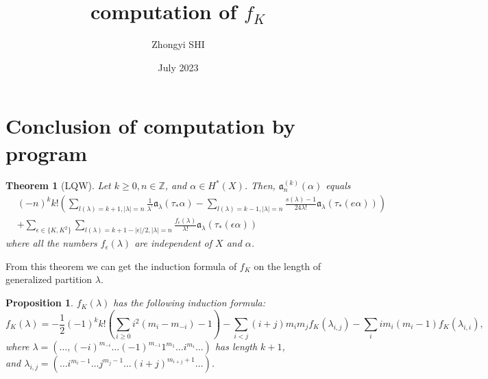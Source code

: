 \documentclass{article}
\title{computation of $f_K$}
\author{Zhongyi SHI }
\date{July 2023}
\newtheorem{theorem}{Theorem}[section]
\newtheorem{prop}{Proposition}[theorem]
\newtheorem{lemma}{Lemma}[theorem]
\begin{document}
\maketitle
\tableofcontents
\section{Conclusion of computation by program}

\begin{theorem}[LQW]
Let $k\geqslant0,n\in\mathbb{Z}$, and $\alpha\in H^{*}(X)$. Then, $\mathfrak{a}^{(k)}_n (\alpha)$ equals 
\[
\begin{aligned}
&(-n)^k k! \left(\sum_{\mathit{l}(\lambda)=k+1,|\lambda|=n} \frac{1}{\lambda^!} \mathfrak{a}_\lambda(\tau_*\alpha)-\sum_{\mathit{l}(\lambda)=k-1,|\lambda|=n} \frac{s(\lambda)-1}{24\lambda!} \mathfrak{a}_\lambda(\tau_*(e\alpha))\right) \\
&+\sum_{\epsilon\in\{K,K^2\}} \sum_{\mathit{l}(\lambda)=k+1-|\epsilon|/2,|\lambda|=n} \frac{f_\epsilon(\lambda)} {\lambda!} \mathfrak{a}_\lambda(\tau_*(\epsilon\alpha))
\end{aligned}
\]
where all the numbers $f_\epsilon(\lambda)$ are independent of $X$ and $\alpha$.
\end{theorem}

From this theorem we can get the induction formula of $f_K$ on the length of generalized partition $\lambda$.

\begin{prop}
$f_K(\lambda)$ has the following induction formula:
\[f_K(\lambda) = -\frac{1}{2}(-1)^kk!\left(\sum_{i\geqslant 0}i^2(m_i-m_{-i})-1\right)-\sum_{i<j}(i+j)m_im_jf_K(\lambda_{i,j})-\sum_{i}im_i(m_i-1)f_K(\lambda_{i,i}),\]
where $\lambda=(\ldots,(-i)^{m_{-i}}\ldots(-1)^{m_{-1}}1^{m_1}\ldots i^{m_i}\ldots)$ has length $k+1$, \\
and $\lambda_{i,j}=(\ldots i^{m_i-1}\ldots j^{m_j-1}\ldots (i+j)^{m_{i+j}+1}\ldots)$.
\end{prop}
\end{document}
